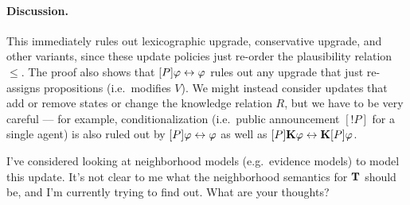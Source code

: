 \documentclass[letterpaper]{article}
\begin{document}
\paragraph*{Discussion.} This immediately rules out lexicographic upgrade, conservative upgrade, and other variants, since these update policies just re-order the plausibility relation $\leq$.  The proof also shows that $[P] \varphi \leftrightarrow \varphi$ rules out any upgrade that just re-assigns propositions (i.e.\ modifies $V$).  We might instead consider updates that add or remove states or change the knowledge relation $R$, but we have to be very careful --- for example, conditionalization (i.e.\ public announcement $[!P]$ for a single agent) is also ruled out by $[P] \varphi \leftrightarrow \varphi$ as well as $[P] \textrm{\textup{\textbf{K}}} \varphi \leftrightarrow \textrm{\textup{\textbf{K}}} [P] \varphi$.

I've considered looking at neighborhood models (e.g.\ evidence models) to model this update.  It's not clear to me what the neighborhood semantics for $\textrm{\textup{\textbf{T}}}$ should be, and I'm currently trying to find out.  What are your thoughts?

\printbibliography
\end{document}
